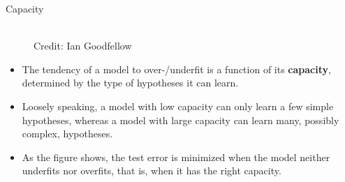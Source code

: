 \documentclass[11pt,compress,t,notes=noshow, xcolor=table]{beamer}
\begin{document}
\begin{vbframe} {Capacity}
  \begin{figure}
    \centering
      \tiny{\\ Credit: Ian Goodfellow}
  \end{figure}
  \begin{itemize}
    \item The tendency of a model to over-/underfit is a function of its \textbf{capacity}, determined by the type of hypotheses it can learn.
    \item Loosely speaking, a model with low capacity can only learn a few simple hypotheses, whereas a model with large capacity can learn many, possibly complex, hypotheses.
    \item As the figure shows, the test error is minimized when the model neither underfits nor overfits, that is, when it has the right capacity.
  \end{itemize}
\end{vbframe}
\end{document}
